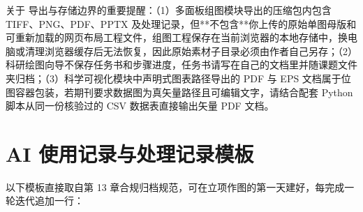 \begin{BookNote}
关于 \scidraw{} 导出与存储边界的重要提醒：（1）多面板组图模块导出的压缩包内包含 TIFF、PNG、PDF、PPTX 及处理记录，但**不包含**你上传的原始单图母版和可重新加载的网页布局工程文件，组图工程保存在当前浏览器的本地存储中，换电脑或清理浏览器缓存后无法恢复，因此原始素材子目录必须由作者自己另存；（2）科研绘图向导不保存任务书和步骤进度，任务书请写在自己的文档里并随课题文件夹归档；（3）科学可视化模块中声明式图表路径导出的 PDF 与 EPS 文档属于位图容器包装，若期刊要求数据图为真矢量路径且可编辑文字，请结合配套 Python 脚本从同一份核验过的 CSV 数据表直接输出矢量 PDF 文档。
\end{BookNote}

\section{AI 使用记录与处理记录模板}

以下模板直接取自第 13 章合规归档规范，可在立项作图的第一天建好，每完成一轮迭代追加一行：

